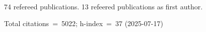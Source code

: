 74 refereed publications. 13 refeered publications as first author.

Total citations~=~5022; h-index~=~37 (2025-07-17)